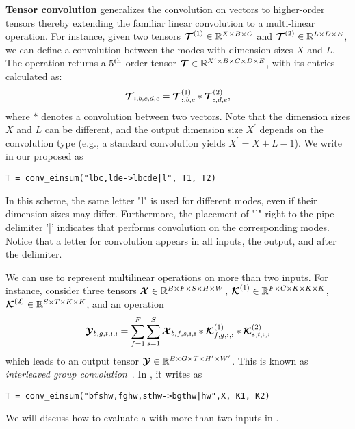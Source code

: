 {\bf Tensor convolution} generalizes the convolution on vectors to higher-order tensors thereby extending the familiar linear convolution to a multi-linear operation.
For instance, given two tensors $\bm{\mathcal{T}}^{(1)} \in \mathbb{R}^{X \times B \times C}$ and $ \bm{\mathcal{T}}^{(2)} \in \mathbb{R}^{L \times D \times E}$, we can define a convolution between the modes with dimension sizes $X$ and $L$. The operation returns a $5^{\mathrm{th}}$ order tensor $\bm{\mathcal{T}} \in \mathbb{R}^{X^\prime \times B \times C \times D \times E}$, with its entries calculated as:
\begingroup
\abovedisplayskip=5pt
\belowdisplayskip=5pt
\begin{equation}
\label{eq:convolution}
\bm{\mathcal{T}}_{\bm{:},b,c,d,e} = 
\bm{\mathcal{T}}^{(1)}_{\bm{:},b,c} \ast
\bm{\mathcal{T}}^{(2)}_{\bm{:},d,e},
\end{equation}
\endgroup
where $\ast$ denotes a convolution between two vectors. Note that the dimension sizes $X$ and $L$ can be different, and the output dimension size $X^\prime$ depends on the convolution type (e.g., a standard convolution yields $X^\prime = X + L - 1$).
We write  in our proposed \conveinsum as
\begin{lstlisting}
T = conv_einsum("lbc,lde->lbcde|l", T1, T2)
\end{lstlisting}
\vspace{-1em}
In this scheme, the same letter \textsf{"l"} is used for different modes, even if their dimension sizes may differ. Furthermore, the placement of \textsf{"l"} right to the pipe-delimiter '\textsf{|}' indicates that \conveinsum performs convolution on the corresponding modes. Notice that a letter for convolution appears in all inputs, the output, and after the delimiter.

We can use \conveinsum to represent multilinear operations on more than two inputs. For instance, consider three tensors $\bm{\mathcal{X}} \in \mathbb{R}^{B \times F \times S \times H \times W}$, $\bm{\mathcal{K}}^{(1)} \in \mathbb{R}^{F \times G \times K \times K \times K}$, $\bm{\mathcal{K}}^{(2)} \in \mathbb{R}^{S \times T \times K \times K}$, and an operation
\begingroup
\abovedisplayskip=5pt
\belowdisplayskip=5pt
\begin{equation}
\bm{\mathcal{Y}}_{b,g,t,\bm{:},\bm{:}} = \sum_{f = 1}^{F} \sum_{s = 1}^{S} 
\bm{\mathcal{X}}_{b,f,s,\bm{:},\bm{:}} \ast \bm{\mathcal{K}}^{(1)}_{f,g,\bm{:},\bm{:}} \ast \bm{\mathcal{K}}^{(2)}_{s,t,\bm{:},\bm{:}} 
\end{equation}
which leads to an output tensor $\bm{\mathcal{Y}} 
\in \mathbb{R}^{B \times G \times T \times H^\prime \times W^\prime}$. This is known as {\em interleaved group convolution}~\citep{zhang2017interleaved}. In \conveinsum, it writes as
\begin{lstlisting}
T = conv_einsum("bfshw,fghw,sthw->bgthw|hw",X, K1, K2)
\end{lstlisting}
\vspace{-1em}
We will discuss how to evaluate a \conveinsum with more than two inputs in .

